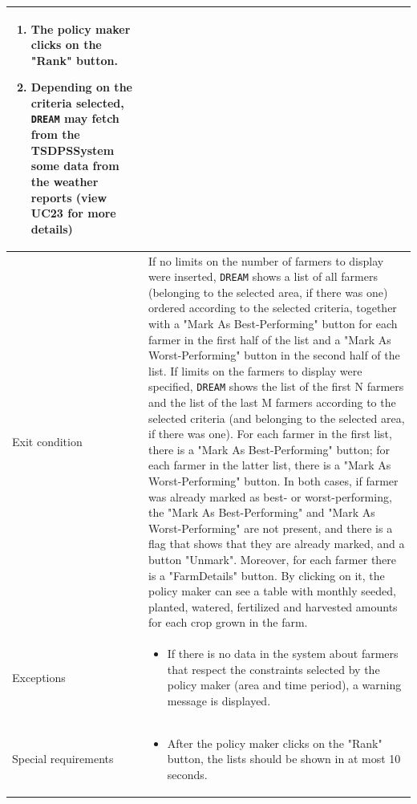 \documentclass{article}
\begin{document}
\begin{longtable}{|p{3.5cm}|m{8cm}|}
\begin{enumerate}
    \item The policy maker clicks on the "Rank" button.
    \item Depending on the criteria selected, \verb|DREAM| may fetch from the TSDPSSystem some data from the weather reports (view UC23 for more details)
 \end{enumerate}\\
 \hline
 Exit condition & If no limits on the number of farmers to display were inserted, \verb|DREAM| shows a list of all farmers (belonging to the selected area, if there was one) ordered according to the selected criteria, together with a "Mark As Best-Performing" button for each farmer in the first half of the list and a "Mark As Worst-Performing" button in the second half of the list. \newline
 If limits on the farmers to display were specified, \verb|DREAM| shows the list of the first N farmers and the list of the last M farmers according to the selected criteria (and belonging to the selected area, if there was one). For each farmer in the first list, there is a "Mark As Best-Performing" button; for each farmer in the latter list, there is a "Mark As Worst-Performing" button.
 \newline
 In both cases, if farmer was already marked as best- or worst-performing, the "Mark As Best-Performing" and "Mark As Worst-Performing" are not present, and there is a flag that shows that they are already marked, and a button "Unmark".
 \newline
 Moreover, for each farmer there is a "FarmDetails" button. By clicking on it, the policy maker can see a table with monthly seeded, planted, watered, fertilized and harvested amounts for each crop grown in the farm.\\
 \hline
 Exceptions & \begin{itemize}
    \item If there is no data in the system about farmers that respect the constraints selected by the policy maker (area and time period), a warning message is displayed.
 \end{itemize}\\
 \hline
 Special requirements &\begin{itemize}
     \item After the policy maker clicks on the "Rank" button, the lists should be shown in at most 10 seconds.
 \end{itemize}\\
 \hline
\end{longtable}
\end{document}
